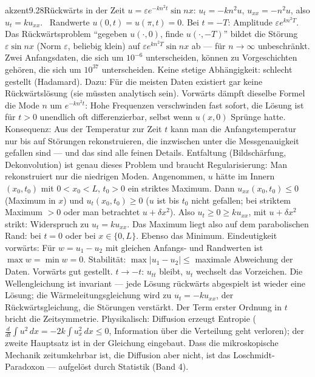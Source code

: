 \begin{loesungkarte}{akzent}{9.28}{Rückwärts in der Zeit}
$u = \varepsilon e^{-kn^{2}t}\sin nx$: $u_t = -kn^{2}u$, $u_{xx} = -n^{2}u$, also $u_t = ku_{xx}$. \checkmark\ Randwerte $u(0, t) = u(\pi, t) = 0$. Bei $t = -T$: Amplitude $\varepsilon e^{kn^{2}T}$. Das Rückwärtsproblem \enquote{gegeben $u(\cdot, 0)$, finde $u(\cdot, -T)$} bildet die Störung $\varepsilon\sin nx$ (Norm $\varepsilon$, beliebig klein) auf $\varepsilon e^{kn^{2}T}\sin nx$ ab --- für $n\to\infty$ unbeschränkt. Zwei Anfangsdaten, die sich um $10^{-6}$ unterscheiden, können zu Vorgeschichten gehören, die sich um $10^{37}$ unterscheiden. Keine stetige Abhängigkeit: schlecht gestellt (Hadamard). Dazu: Für die meisten Daten existiert gar keine Rückwärtslösung (sie müssten analytisch sein).
Vorwärts dämpft dieselbe Formel die Mode $n$ um $e^{-kn^{2}t}$: Hohe Frequenzen verschwinden fast sofort, die Lösung ist für $t > 0$ unendlich oft differenzierbar, selbst wenn $u(x, 0)$ Sprünge hatte. Konsequenz: Aus der Temperatur zur Zeit $t$ kann man die Anfangstemperatur nur bis auf Störungen rekonstruieren, die inzwischen unter die Messgenauigkeit gefallen sind --- und das sind alle feinen Details. Entfaltung (Bildschärfung, Dekonvolution) ist genau dieses Problem und braucht Regularisierung: Man rekonstruiert nur die niedrigen Moden.
Angenommen, $u$ hätte im Innern $(x_0, t_0)$ mit $0 < x_0 < L$, $t_0 > 0$ ein striktes Maximum. Dann $u_{xx}(x_0, t_0)\le0$ (Maximum in $x$) und $u_t(x_0, t_0)\ge0$ ($u$ ist bis $t_0$ nicht gefallen; bei striktem Maximum $> 0$ oder man betrachtet $u + \delta x^{2}$). Also $u_t\ge0\ge ku_{xx}$, mit $u + \delta x^{2}$ strikt: Widerspruch zu $u_t = ku_{xx}$. Das Maximum liegt also auf dem parabolischen Rand: bei $t = 0$ oder bei $x\in\{0, L\}$. Ebenso das Minimum. Eindeutigkeit vorwärts: Für $w = u_1 - u_2$ mit gleichen Anfangs- und Randwerten ist $\max w = \min w = 0$. Stabilität: $\max|u_1 - u_2|\le$ maximale Abweichung der Daten. Vorwärts gut gestellt.
$t\to-t$: $u_{tt}$ bleibt, $u_t$ wechselt das Vorzeichen. Die Wellengleichung ist invariant --- jede Lösung rückwärts abgespielt ist wieder eine Lösung; die Wärmeleitungsgleichung wird zu $u_t = -ku_{xx}$, der Rückwärtsgleichung, die Störungen verstärkt. Der Term erster Ordnung in $t$ bricht die Zeitsymmetrie. Physikalisch: Diffusion erzeugt Entropie ($\frac d{dt}\int u^{2}\,dx = -2k\int u_x^{2}\,dx\le0$, Information über die Verteilung geht verloren); der zweite Hauptsatz ist in der Gleichung eingebaut. Dass die mikroskopische Mechanik zeitumkehrbar ist, die Diffusion aber nicht, ist das Loschmidt-Paradoxon --- aufgelöst durch Statistik (Band 4).

\end{loesungkarte}
